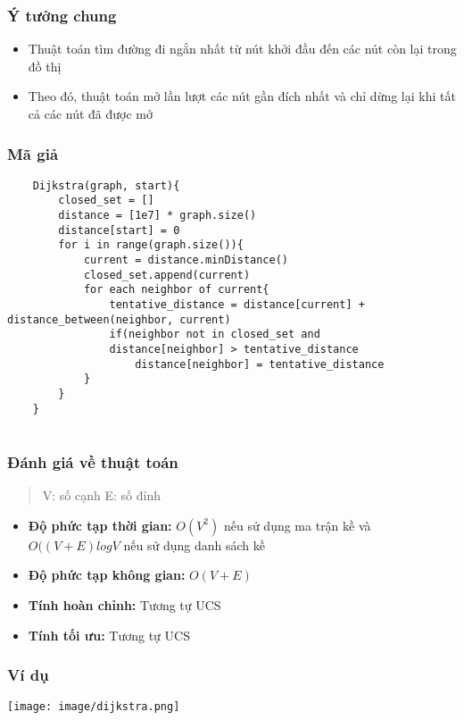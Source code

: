 \documentclass{article}
\begin{document}
\subsubsection{Ý tưởng chung}
\begin{itemize}
    \item Thuật toán tìm đường đi ngắn nhất từ nút khởi đầu đến các nút còn lại trong đồ thị
    \item Theo đó, thuật toán mở lần lượt các nút gần đích nhất và chỉ dừng lại khi tất cả các nút đã được mở
\end{itemize}

\subsubsection{Mã giả}

\begin{verbatim}
    Dijkstra(graph, start){
        closed_set = []
        distance = [1e7] * graph.size()
        distance[start] = 0
        for i in range(graph.size()){
            current = distance.minDistance()
            closed_set.append(current)
            for each neighbor of current{
                tentative_distance = distance[current] + distance_between(neighbor, current)
                if(neighbor not in closed_set and 
                distance[neighbor] > tentative_distance
                    distance[neighbor] = tentative_distance
            }
        }
    }
    
\end{verbatim}
\subsubsection{Đánh giá về thuật toán}
\begin{quote}
    V: số cạnh \hspace{0.5in}
    E: số đỉnh 
\end{quote}
\begin{itemize}
    \item \textbf{Độ phức tạp thời gian:} $O(V^2)$ nếu sử dụng ma trận kề và $O((V+E)logV$ nếu sử dụng danh sách kề
    \item \textbf{Độ phức tạp không gian:} $O(V+E)$ 
    \item \textbf{Tính hoàn chỉnh:} Tương tự UCS
    \item \textbf{Tính tối ưu:} Tương tự UCS
\end{itemize}

\subsubsection{Ví dụ}
    \centerline{\texttt{[image: image/dijkstra.png]}}
    \vspace{2\baselineskip}
    
\end{document}
